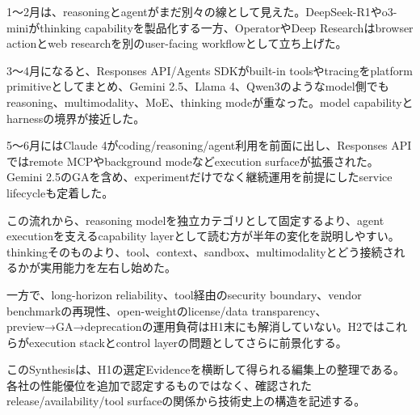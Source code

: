 
1〜2月は、reasoningとagentがまだ別々の線として見えた。DeepSeek-R1やo3-miniがthinking capabilityを製品化する一方、OperatorやDeep Researchはbrowser actionとweb researchを別のuser-facing workflowとして立ち上げた。\autocite{src-421ee9af3f80}


3〜4月になると、Responses API/Agents SDKがbuilt-in toolsやtracingをplatform primitiveとしてまとめ、Gemini 2.5、Llama 4、Qwen3のようなmodel側でもreasoning、multimodality、MoE、thinking modeが重なった。model capabilityとharnessの境界が接近した。\autocite{src-05f285e9757b,src-3e4a3f3b3d83,src-421ee9af3f80,src-78593f4b387f}


5〜6月にはClaude 4がcoding/reasoning/agent利用を前面に出し、Responses APIではremote MCPやbackground modeなどexecution surfaceが拡張された。Gemini 2.5のGAを含め、experimentだけでなく継続運用を前提にしたservice lifecycleも定着した。\autocite{src-4ec03078d316,src-9257c39d4172}


この流れから、reasoning modelを独立カテゴリとして固定するより、agent executionを支えるcapability layerとして読む方が半年の変化を説明しやすい。thinkingそのものより、tool、context、sandbox、multimodalityとどう接続されるかが実用能力を左右し始めた。\autocite{src-421ee9af3f80,src-4ec03078d316,src-78593f4b387f}


一方で、long-horizon reliability、tool経由のsecurity boundary、vendor benchmarkの再現性、open-weightのlicense/data transparency、preview→GA→deprecationの運用負荷はH1末にも解消していない。H2ではこれらがexecution stackとcontrol layerの問題としてさらに前景化する。\autocite{src-05f285e9757b,src-3e4a3f3b3d83,src-9257c39d4172}


\begin{claimboundary}
このSynthesisは、H1の選定Evidenceを横断して得られる編集上の整理である。各社の性能優位を追加で認定するものではなく、確認されたrelease/availability/tool surfaceの関係から技術史上の構造を記述する。
\end{claimboundary}

